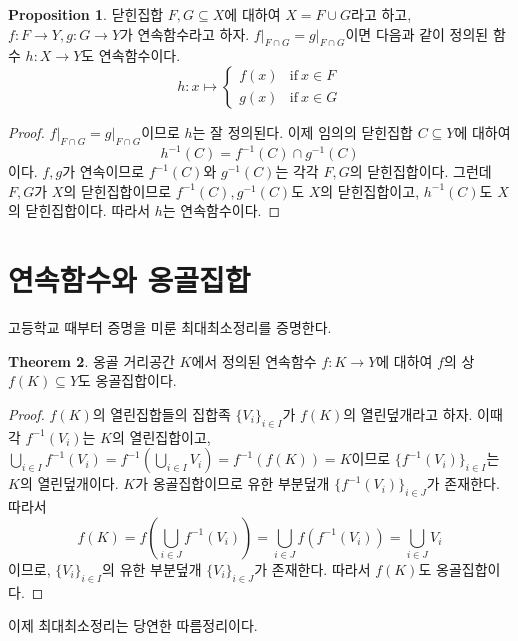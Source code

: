 \documentclass[11pt]{book}
\numberwithin{equation}{chapter}
\newcommand{\paren}[1]{\left(#1\right)}
\def\textif{\text{if}}
\theoremstyle{definition}
\newtheorem{thm}{Theorem}[section]
\newtheorem{prop}[thm]{Proposition}
\begin{document}
\begin{prop} \label{prop 7.1.13}
    닫힌집합 \(F, G \subseteq X\)에 대하여 \(X = F \cup G\)라고 하고, \(f : F \to Y, g : G \to Y\)가 연속함수라고 하자. \(f \vert_{F \cap G} = g \vert_{F \cap G}\)이면 다음과 같이 정의된 함수 \(h : X \to Y\)도 연속함수이다.
    \[
      h : x \mapsto \begin{cases}
        f(x) &\textif \ x \in F\\
        g(x) &\textif \ x \in G
      \end{cases}  
    \]
\end{prop}
\begin{proof}
    \(f \vert_{F \cap G} = g \vert_{F \cap G}\)이므로 \(h\)는 잘 정의된다. 이제 임의의 닫힌집합 \(C \subseteq Y\)에 대하여
    \[
    h^{-1}(C) = f^{-1}(C) \cap g^{-1}(C)    
    \]
    이다. \(f, g\)가 연속이므로 \(f^{-1}(C)\)와 \(g^{-1}(C)\)는 각각 \(F, G\)의 닫힌집합이다. 그런데 \(F, G\)가 \(X\)의 닫힌집합이므로 \(f^{-1}(C), g^{-1}(C)\)도 \(X\)의 닫힌집합이고, \(h^{-1}(C)\)도 \(X\)의 닫힌집합이다. 따라서 \(h\)는 연속함수이다.
\end{proof}



\section{연속함수와 옹골집합}

고등학교 때부터 증명을 미룬 최대최소정리를 증명한다.

\begin{thm}
    옹골 거리공간 \(K\)에서 정의된 연속함수 \(f : K \to Y\)에 대하여 \(f\)의 상 \(f(K) \subseteq Y\)도 옹골집합이다.
\end{thm}
\begin{proof}
    \(f(K)\)의 열린집합들의 집합족 \(\{V_i\}_{i \in I}\)가 \(f(K)\)의 열린덮개라고 하자. 이때 각 \(f^{-1}(V_i)\)는 \(K\)의 열린집합이고, \(\bigcup_{i \in I} f^{-1}(V_i) = f^{-1} \paren{\bigcup_{i \in I} V_i} =f^{-1}(f(K)) = K\)이므로 \(\{f^{-1}(V_i)\}_{i \in I}\)는 \(K\)의 열린덮개이다. \(K\)가 옹골집합이므로 유한 부분덮개 \(\{f^{-1}(V_i)\}_{i \in J}\)가 존재한다. 따라서
    \[
    f(K) = f \paren{\bigcup_{i \in J} f^{-1}(V_i)} = \bigcup_{i \in J} f(f^{-1}(V_i)) = \bigcup_{i\in J} V_i
    \]
    이므로, \(\{V_i\}_{i \in I}\)의 유한 부분덮개 \(\{V_i\}_{i \in J}\)가 존재한다. 따라서 \(f(K)\)도 옹골집합이다.
\end{proof}

이제 최대최소정리는 당연한 따름정리이다.
\end{document}

